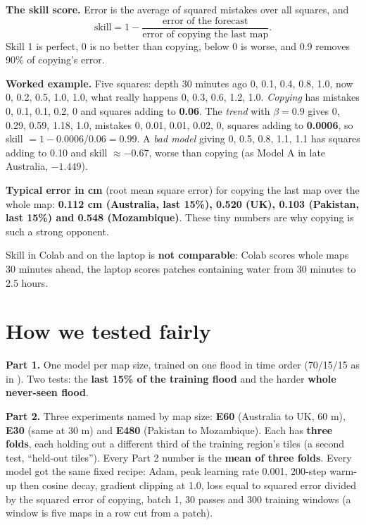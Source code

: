 \textbf{The skill score.} Error is the average of squared mistakes over all squares, and
\[ \text{skill} = 1 - \frac{\text{error of the forecast}}{\text{error of copying the last map}}. \]
Skill 1 is perfect, 0 is no better than copying, below 0 is worse, and 0.9 removes 90\% of copying's error.

\textbf{Worked example.} Five squares: depth 30 minutes ago 0, 0.1, 0.4, 0.8, 1.0, now 0, 0.2, 0.5, 1.0, 1.0, what really happens 0, 0.3, 0.6, 1.2, 1.0. \emph{Copying} has mistakes 0, 0.1, 0.1, 0.2, 0 and squares adding to \textbf{0.06}. The \emph{trend} with $\beta=0.9$ gives 0, 0.29, 0.59, 1.18, 1.0, mistakes 0, 0.01, 0.01, 0.02, 0, squares adding to \textbf{0.0006}, so skill $=1-0.0006/0.06=0.99$. A \emph{bad model} giving 0, 0.5, 0.8, 1.1, 1.1 has squares adding to 0.10 and skill $\approx-0.67$, worse than copying (as Model A in late Australia, $-1.449$).


\textbf{Typical error in cm} (root mean square error) for copying the last map over the whole map: \textbf{0.112 cm (Australia, last 15\%), 0.520 (UK), 0.103 (Pakistan, last 15\%) and 0.548 (Mozambique)}. These tiny numbers are why copying is such a strong opponent.

\begin{carefulbox}
Skill in Colab and on the laptop is \textbf{not comparable}: Colab scores whole maps 30 minutes ahead, the laptop scores patches containing water from 30 minutes to 2.5 hours.
\end{carefulbox}

\section{How we tested fairly}\label{ch:test}

\textbf{Part 1.} One model per map size, trained on one flood in time order (70/15/15 as in ). Two tests: the \textbf{last 15\% of the training flood} and the harder \textbf{whole never-seen flood}.

\textbf{Part 2.} Three experiments named by map size: \textbf{E60} (Australia to UK, 60 m), \textbf{E30} (same at 30 m) and \textbf{E480} (Pakistan to Mozambique). Each has \textbf{three folds}, each holding out a different third of the training region's tiles (a second test, ``held-out tiles''). Every Part 2 number is the \textbf{mean of three folds}. Every model got the same fixed recipe: Adam, peak learning rate 0.001, 200-step warm-up then cosine decay, gradient clipping at 1.0, loss equal to squared error divided by the squared error of copying, batch 1, 30 passes and 300 training windows (a window is five maps in a row cut from a patch).


